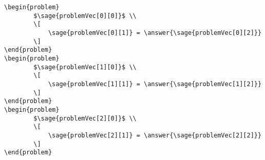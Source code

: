 \documentclass{ximera}
\begin{document}
\begin{verbatim}
\begin{problem}
        $\sage{problemVec[0][0]}$ \\
        \[ 
            \sage{problemVec[0][1]} = \answer{\sage{problemVec[0][2]}}
        \]
\end{problem}
\begin{problem}
        $\sage{problemVec[1][0]}$ \\
        \[
            \sage{problemVec[1][1]} = \answer{\sage{problemVec[1][2]}}
        \]
\end{problem}
\begin{problem}
        $\sage{problemVec[2][0]}$ \\
        \[
            \sage{problemVec[2][1]} = \answer{\sage{problemVec[2][2]}}
        \]
\end{problem}
        \end{verbatim}
\end{document}
